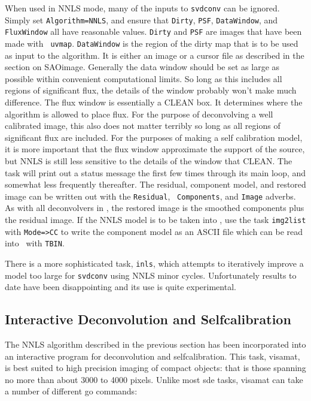 When used in NNLS mode, many of the inputs to {\tt svdconv} can be
ignored.  Simply set {\tt Algorithm=NNLS}, and ensure that {\tt Dirty},
{\tt PSF}, {\tt DataWindow}, and {\tt FluxWindow} all have reasonable
values.  {\tt Dirty} and {\tt PSF} are images that have been made with {\tt
uvmap}.  {\tt DataWindow} is the region of the dirty map that is to be used
as input to the algorithm.  It is either an image or a cursor file as
described in the section on SAOimage.  Generally the data window should be
set as large as possible within convenient computational limits.  So long
as this includes all regions of significant flux, the details of the window
probably won't make much difference.  The flux window is essentially a
CLEAN box.  It determines where the algorithm is allowed to place flux.
For the purpose of deconvolving a well calibrated image, this also does not
matter terribly so long as all regions of significant flux are included.
For the purposes of making a self calibration model, it is more important
that the flux window approximate the support of the source, but NNLS is
still less sensitive to the details of the window that CLEAN.  The task
will print out a status message the first few times through its main loop,
and somewhat less frequently thereafter.  The residual, component model,
and restored image can be written out with the {\tt Residual}, {\tt
Components}, and {\tt Image} adverbs.  As with all deconvolvers in \sde,
the restored image is the smoothed components plus the residual image.  If
the NNLS model is to be taken into \aips, use the task {\tt img2list} with
{\tt Mode=>CC} to write the component model as an ASCII file which can be
read into \aips\ with {\tt TBIN}.

There is a more sophisticated task, {\tt inls}, which attempts to
iteratively improve a model too large for {\tt svdconv} using NNLS minor
cycles.  Unfortunately results to date have been disappointing and its use
is quite experimental.

\subsection{Interactive Deconvolution and Selfcalibration}

The NNLS algorithm described in the previous section has been
incorporated into an interactive program for deconvolution and
selfcalibration. This task, visamat, is best suited to high precision
imaging of compact objects: that is those spanning no more than about
3000 to 4000 pixels. Unlike most sde tasks, visamat can take a number
of different go commands:

